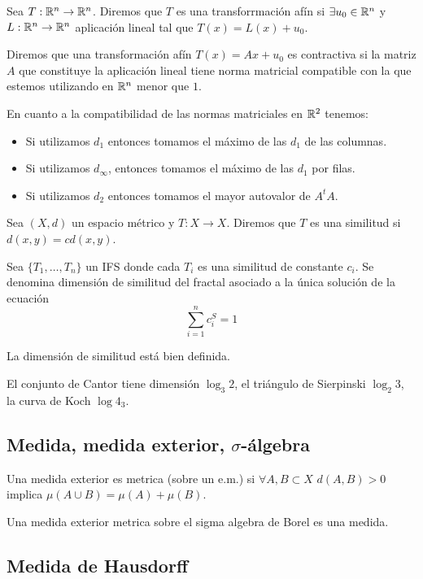 \documentclass[FyPI.tex]{subfiles}
\begin{document}
\begin{defi}
Sea $T:\mathbb{R}^n\to\mathbb{R}^n$. Diremos que $T$ es una transforrmación afín si $\exists u_0 \in \mathbb{R}^n$ y $L:\mathbb{R}^n\to\mathbb{R}^n$ aplicación lineal tal que $T(x)=L(x)+u_0$.
\end{defi}
\begin{defi}
Diremos que una transformación afín $T(x)=Ax+u_0$ es contractiva si la matriz $A$ que constituye la aplicación lineal tiene norma matricial compatible con la que estemos utilizando en $\mathbb{R}^n$ menor que $1$.
\end{defi}
\begin{nota}
En cuanto a la compatibilidad de las normas matriciales en $\mathbb{R}^2$ tenemos: 
\begin{itemize}
\item Si utilizamos $d_1$ entonces tomamos el máximo de las $d_1$ de las columnas.
\item Si utilizamos $d_\infty$, entonces tomamos el máximo de las $d_1$ por filas.
\item Si utilizamos $d_2$ entonces tomamos el mayor autovalor de $A^tA$.
\end{itemize}
\end{nota}
\begin{defi}
Sea $(X,d)$ un espacio métrico y $T:X\to X$. Diremos que $T$ es una similitud si $d(x,y)=c d(x,y)$.
\end{defi}
\begin{defi}
Sea $\{T_1,\dotsc,T_n\}$ un IFS donde cada $T_i$ es una similitud de constante $c_i$. Se denomina dimensión de similitud del fractal asociado a la única solución de la ecuación
$$
\sum_{i=1}^n c^S_i = 1
$$

\end{defi}
\begin{nota}
La dimensión de similitud está bien definida.
\end{nota}
\begin{example}
El conjunto de Cantor tiene dimensión $\log_3 2$, el triángulo de Sierpinski $\log_2 3$, la curva de Koch $\log 4_3$. 
\end{example}
\subsection{Medida, medida exterior, $\sigma$-álgebra}

Una medida exterior es metrica (sobre un e.m.) si $\forall A,B \subset X$ $d(A,B)>0$ implica $\mu(A\cup B) = \mu(A)+\mu(B)$.

Una medida exterior metrica sobre el sigma algebra de Borel es una medida.
\subsection{Medida de Hausdorff}
\end{document}
